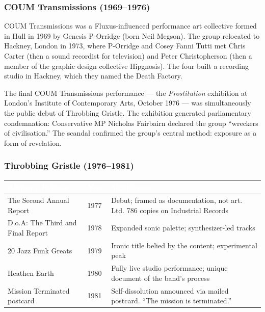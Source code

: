 \documentclass[11pt,letterpaper]{article}
\newcommand{\tableheader}[1]{\textbf{\sffamily\textcolor{white}{#1}}}
\begin{document}
\subsubsection{COUM Transmissions (1969--1976)}

COUM Transmissions was a Fluxus-influenced performance art collective formed in Hull in 1969 by
Genesis P-Orridge (born Neil Megson). The group relocated to Hackney, London in 1973, where
P-Orridge and Cosey Fanni Tutti met Chris Carter (then a sound recordist for television) and
Peter Christopherson (then a member of the graphic design collective Hipgnosis). The four built
a recording studio in Hackney, which they named the Death Factory.

The final COUM Transmissions performance — the \textit{Prostitution} exhibition at London's
Institute of Contemporary Arts, October 1976 — was simultaneously the public debut of
Throbbing Gristle. The exhibition generated parliamentary condemnation: Conservative MP Nicholas
Fairbairn declared the group ``wreckers of civilisation.'' The scandal confirmed the group's
central method: exposure as a form of revelation.

\subsubsection{Throbbing Gristle (1976--1981)}

\begin{center}
\begin{tabularx}{\textwidth}{L{3.5cm}L{2.5cm}X}
\toprule
{}
\tableheader{Album / Release} & \tableheader{Year} & \tableheader{Significance} \\
\midrule
The Second Annual Report & 1977 & Debut; framed as documentation, not art. Ltd. 786 copies on Industrial Records \\
D.o.A: The Third and Final Report & 1978 & Expanded sonic palette; synthesizer-led tracks \\
20 Jazz Funk Greats & 1979 & Ironic title belied by the content; experimental peak \\
Heathen Earth & 1980 & Fully live studio performance; unique document of the band's process \\
Mission Terminated postcard & 1981 & Self-dissolution announced via mailed postcard. ``The mission is terminated.'' \\
\bottomrule
\end{tabularx}
\end{center}
\end{document}
